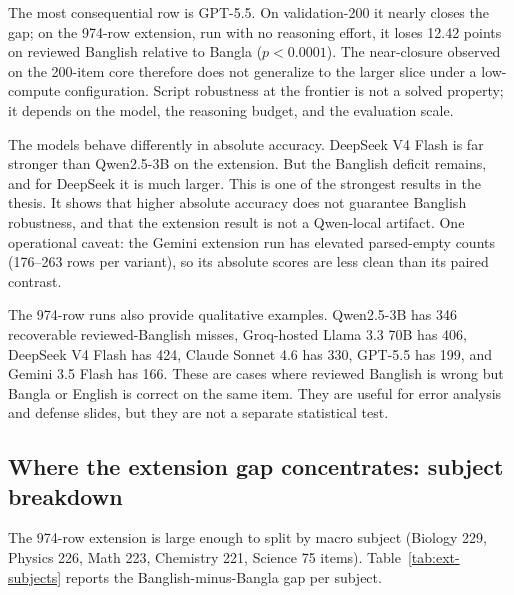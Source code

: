 The most consequential row is GPT-5.5. On validation-200 it nearly closes the gap; on the 974-row extension, run with no reasoning effort, it loses 12.42 points on reviewed Banglish relative to Bangla ($p < 0.0001$). The near-closure observed on the 200-item core therefore does not generalize to the larger slice under a low-compute configuration. Script robustness at the frontier is not a solved property; it depends on the model, the reasoning budget, and the evaluation scale.

The models behave differently in absolute accuracy. DeepSeek V4 Flash is far stronger than Qwen2.5-3B on the extension. But the Banglish deficit remains, and for DeepSeek it is much larger. This is one of the strongest results in the thesis. It shows that higher absolute accuracy does not guarantee Banglish robustness, and that the extension result is not a Qwen-local artifact. One operational caveat: the Gemini extension run has elevated parsed-empty counts (176--263 rows per variant), so its absolute scores are less clean than its paired contrast.

The 974-row runs also provide qualitative examples. Qwen2.5-3B has 346 recoverable reviewed-Banglish misses, Groq-hosted Llama 3.3 70B has 406, DeepSeek V4 Flash has 424, Claude Sonnet 4.6 has 330, GPT-5.5 has 199, and Gemini 3.5 Flash has 166. These are cases where reviewed Banglish is wrong but Bangla or English is correct on the same item. They are useful for error analysis and defense slides, but they are not a separate statistical test.

\subsection{Where the extension gap concentrates: subject breakdown}

The 974-row extension is large enough to split by macro subject (Biology 229, Physics 226, Math 223, Chemistry 221, Science 75 items). Table~\ref{tab:ext-subjects} reports the Banglish-minus-Bangla gap per subject.

